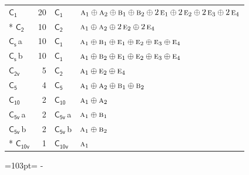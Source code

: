 \documentclass[10pt,a4paper]{article}
\newcommand{\needspace}[1]{\par\penalty-100\begingroup\dimen0=#1\relax\dimen2=\pagegoal
  \advance\dimen2-\pagetotal\ifdim\dimen0>\dimen2\relax\ifdim\dimen2>0pt\vfil\break\fi\fi
  \endgroup}
\numberwithin{equation}{section}
\newcommand{\grp}[1]{\mathsf{#1}}
\newcommand{\irr}[1]{\text{\normalfont\scshape #1}}
\newcommand{\clsletter}[1]{\,{\scriptsize\color{black!55}#1}}
\newlength{\fillwidth}\newlength{\cellwidth}\newlength{\colwidth}
\begin{document}
{\begin{longtable}{@{}lrl>{\RaggedRight\arraybackslash}p{\fillwidth}@{}}
\bottomrule\endfoot\endlastfoot
\href{C1.pdf}{$\grp{C_{1}}$} & 20 & \href{C1.pdf}{$\grp{C_{1}}$} & $\irr{a}_{1}\oplus \irr{a}_{2}\oplus \irr{b}_{1}\oplus \irr{b}_{2}\oplus 2\,\irr{e}_{1}\oplus 2\,\irr{e}_{2}\oplus 2\,\irr{e}_{3}\oplus 2\,\irr{e}_{4}$\\*
\href{C2.pdf}{$\grp{C_{2}}$} & 10 & \href{C2.pdf}{$\grp{C_{2}}$} & $\irr{a}_{1}\oplus \irr{a}_{2}\oplus 2\,\irr{e}_{2}\oplus 2\,\irr{e}_{4}$\\
\href{C1v.pdf}{$\grp{C_{s}}$}\clsletter{a} & 10 & \href{C1.pdf}{$\grp{C_{1}}$} & $\irr{a}_{1}\oplus \irr{b}_{1}\oplus \irr{e}_{1}\oplus \irr{e}_{2}\oplus \irr{e}_{3}\oplus \irr{e}_{4}$\\
\href{C1v.pdf}{$\grp{C_{s}}$}\clsletter{b} & 10 & \href{C1.pdf}{$\grp{C_{1}}$} & $\irr{a}_{1}\oplus \irr{b}_{2}\oplus \irr{e}_{1}\oplus \irr{e}_{2}\oplus \irr{e}_{3}\oplus \irr{e}_{4}$\\
\href{C2v.pdf}{$\grp{C_{2v}}$} & 5 & \href{C2.pdf}{$\grp{C_{2}}$} & $\irr{a}_{1}\oplus \irr{e}_{2}\oplus \irr{e}_{4}$\\
\href{C5.pdf}{$\grp{C_{5}}$} & 4 & \href{C5.pdf}{$\grp{C_{5}}$} & $\irr{a}_{1}\oplus \irr{a}_{2}\oplus \irr{b}_{1}\oplus \irr{b}_{2}$\\
\href{C10.pdf}{$\grp{C_{10}}$} & 2 & \href{C10.pdf}{$\grp{C_{10}}$} & $\irr{a}_{1}\oplus \irr{a}_{2}$\\
\href{C5v.pdf}{$\grp{C_{5v}}$}\clsletter{a} & 2 & \href{C5v.pdf}{$\grp{C_{5v}}$}\clsletter{a} & $\irr{a}_{1}\oplus \irr{b}_{1}$\\
\href{C5v.pdf}{$\grp{C_{5v}}$}\clsletter{b} & 2 & \href{C5v.pdf}{$\grp{C_{5v}}$}\clsletter{b} & $\irr{a}_{1}\oplus \irr{b}_{2}$\\*
\href{C10v.pdf}{$\grp{C_{10v}}$} & 1 & \href{C10v.pdf}{$\grp{C_{10v}}$} & $\irr{a}_{1}$\\
\bottomrule\end{longtable}}
\needspace{103pt}
\end{document}
